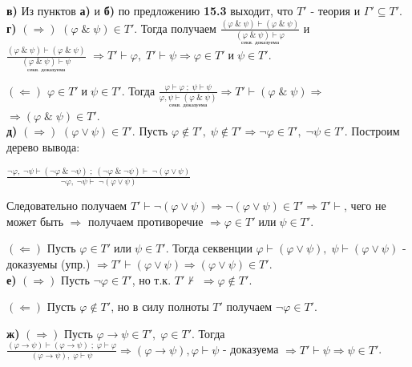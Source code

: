 \documentclass[18pt, a4paper]{extarticle}
\newcommand{\ampersand}{\;\&\;}
\newcommand{\Gm}{\Gamma}
\newcommand{\vp}{\varphi}
\newcommand{\vd}{\vdash}
\begin{document}
\textbf{в)} Из пунктов \textbf{а)} и \textbf{б)} по предложению \textbf{15.3} выходит, что $T'$ -  теория и $\Gm'\subseteq T'$.\\

\textbf{г)} $\boxed{(\Rightarrow)}$ $(\vp\ampersand\psi)\in T'$. Тогда получаем $\displaystyle \frac{(\vp\ampersand\psi)\vd(\vp\ampersand\psi)}{\underset{\text{секв. доказуема}}{(\vp\ampersand\psi)\vd\vp}}$ и\\ $\displaystyle \frac{(\vp\ampersand\psi)\vd(\vp\ampersand\psi)}{\underset{\text{секв. доказуема}}{(\vp\ampersand\psi)\vd\psi}}$
$\Rightarrow T'\vd\vp,\;T'\vd\psi\Rightarrow\vp\in T'\;\text{и}\;\psi\in T'$.

$\boxed{(\Leftarrow)}$ $\vp\in T'\;\text{и}\;\psi\in T'$. Тогда $\displaystyle \frac{\vp\vd\vp\;;\;\psi\vd\psi}{\underset{\text{секв. доказуема}}{\vp,\psi\vd(\vp\ampersand\psi)}}\Rightarrow T'\vd(\vp\ampersand\psi)\Rightarrow$\\
$\Rightarrow(\vp\ampersand\psi)\in T'$.\\

\textbf{д)} $\boxed{(\Rightarrow)}$ $(\vp\vee\psi)\in T'$. Пусть $\vp\notin T',\;\psi\notin T'\Rightarrow\lnot\vp\in T',\;\lnot\psi\in T'$. Построим дерево вывода:

\begin{center}
    $\displaystyle \frac{\lnot\vp,\;\lnot\psi\vd(\lnot\vp\ampersand\lnot\psi)\;;\;(\lnot\vp\ampersand\lnot\psi)\vd\;\lnot(\vp\vee\psi)}{\lnot\vp,\;\lnot\psi\vd\;\lnot(\vp\vee\psi)}$
\end{center}

Следовательно получаем $T'\vd\lnot(\vp\vee\psi)\Rightarrow\lnot(\vp\vee\psi)\in T'\Rightarrow T'\vd$, чего не может быть $\Rightarrow$ получаем противоречие $\Rightarrow\vp\in T'\;\text{или}\;\psi\in T'$.

$\boxed{(\Leftarrow)}$ Пусть $\vp\in T'\;\text{или}\;\psi\in T'$. Тогда секвенции $\vp\vd(\vp\vee\psi),\;\psi\vd(\vp\vee\psi)$ -  доказуемы (упр.) $\Rightarrow T'\vd(\vp\vee\psi)\Rightarrow(\vp\vee\psi)\in T'$.\\

\textbf{е)} $\boxed{(\Rightarrow)}$ Пусть $\lnot\vp\in T'$, но т.к. $T'\nvdash\;\Rightarrow\vp\notin T'$.

$\boxed{(\Leftarrow)}$ Пусть $\vp\notin T'$, но в силу полноты $T'$ получаем $\lnot\vp\in T'$.

\textbf{ж)} $\boxed{(\Rightarrow)}$ Пусть $\vp\to\psi\in T',\;\vp\in T'$. Тогда $\displaystyle \frac{(\vp\to\psi)\vd(\vp\to\psi)\;;\;\vp\vd\vp}{(\vp\to\psi),\;\vp\vd\psi}\Rightarrow(\vp\to\psi),\vp\vd\psi$ - доказуема $\Rightarrow T'\vd\psi\Rightarrow\psi\in T'$.
\end{document}
